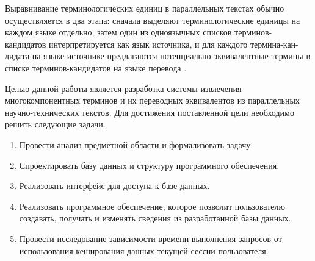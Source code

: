 Выравнивание терминологических единиц в параллельных текстах обычно осуществляется в два этапа: сначала выделяют терминологические единицы на каждом языке отдельно, затем один из одноязычных списков терминов-кандидатов интерпретируется как язык источника, и для каждого термина-кан-\\дидата на языке источнике предлагаются потенциально эквивалентные термины в списке терминов-кандидатов на языке перевода \cite{intro_10}.

Целью данной работы является разработка системы извлечения многокомпонентных терминов и их переводных эквивалентов из параллельных научно-технических текстов. Для достижения поставленной цели необходимо решить следующие задачи.

\begin{enumerate}[label*=\arabic*.]
	\item Провести анализ предметной области и формализовать задачу.
	\item Спроектировать базу данных и структуру программного обеспечения.
	\item Реализовать интерфейс для доступа к базе данных. 
	\item Реализовать программное обеспечение, которое позволит пользователю создавать, получать и изменять сведения из разработанной базы данных. 
	\item Провести исследование зависимости времени выполнения запросов от использования кеширования данных текущей сессии пользователя.
\end{enumerate}

\pagebreak